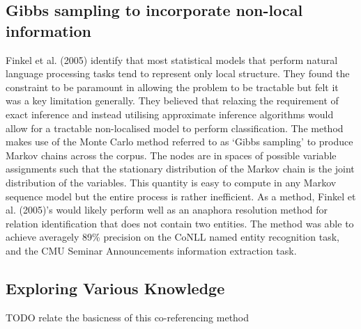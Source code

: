 \documentclass[11pt]{article} %
\begin{document}
\subsection{Gibbs sampling to incorporate non-local information}

Finkel et al. (2005) identify that most statistical models that perform natural language processing tasks tend to represent only local structure. They found the constraint to be paramount in allowing the problem to be tractable but felt it was a key limitation generally. They believed that relaxing the requirement of exact inference and instead utilising approximate inference algorithms would allow for a tractable non-localised model to perform classification. The method makes use of the Monte Carlo method referred to as ‘Gibbs sampling’ to produce Markov chains across the corpus. The nodes are in spaces of possible variable assignments such that the stationary distribution of the Markov chain is the joint distribution of the variables. This quantity is easy to compute in any Markov sequence model but the entire process is rather inefficient. As a method, Finkel et al. (2005)’s would likely perform well as an anaphora resolution method for relation identification that does not contain two entities. The method was able to achieve averagely 89\% precision on the CoNLL named entity recognition task, and the CMU Seminar Announcements information extraction task.

\subsection{Exploring Various Knowledge}

TODO relate the basicness of this co-referencing method
\end{document}
